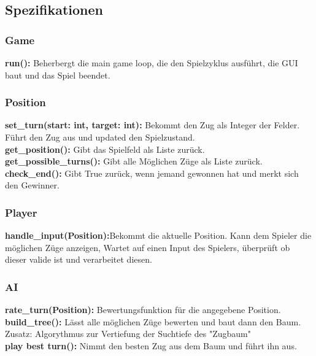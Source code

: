 \documentclass{article}
\begin{document}
\newpage

\subsection{Spezifikationen}

\subsubsection{Game}

\textbf{run():} Beherbergt die main game loop, die den Spielzyklus ausführt, die GUI baut und das Spiel beendet.

\subsubsection{Position}

\textbf{set\_turn(start: int, target: int):} Bekommt den Zug als Integer der Felder. Führt den Zug aus und updated den Spielzustand. \\
\textbf{get\_position():} Gibt das Spielfeld als Liste zurück. \\
\textbf{get\_possible\_turns():} Gibt alle Möglichen Züge als Liste zurück. \\
\textbf{check\_end():} Gibt True zurück, wenn jemand gewonnen hat und merkt sich den Gewinner. \\

\subsubsection{Player}

\textbf{handle\_input(Position):}Bekommt die aktuelle Position. Kann dem Spieler die möglichen Züge anzeigen, Wartet auf einen Input des Spielers, überprüft ob dieser valide
ist und verarbeitet diesen. \\

\subsubsection{AI}
\textbf{rate\_turn(Position):} Bewertungsfunktion für die angegebene Position. \\
\textbf{build\_tree():} Lässt alle möglichen Züge bewerten und baut dann den Baum. \\
Zusatz: Algorythmus zur Vertiefung der Suchtiefe des "Zugbaum"\\
\textbf{play best turn():} Nimmt den besten Zug aus dem Baum und führt ihn aus. \\
\end{document}
